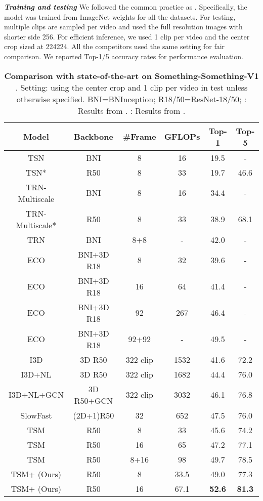 \documentclass[runningheads]{llncs}
\newcommand{\keypoint}[1]{\vspace{0.1cm}\noindent\textbf{#1}\quad}
\begin{document}
\keypoint{\em Training and testing }
We followed the common practice as \cite{lin2019tsm,wang2018non}.
Specifically, the model was trained from 
ImageNet weights
for all the datasets.
For testing, multiple clips are sampled per video and used the full resolution images with shorter side 256.  For efficient inference, we used 1 clip per video and the center crop sized at 224224.
All the competitors used the same setting for fair comparison.
We reported Top-1/5 accuracy rates for performance evaluation.



\begin{table}[h]
\centering
	\begin{tabular}{c|c|c|c|c|c}
		\toprule {\bf Model } & {\bf Backbone } & {\bf \#Frame } & {\bf GFLOPs} & {\bf Top-1 } & {\bf Top-5 } \\\midrule
		TSN \cite{wang2016temporal} & BNI & 8 & 16 & 19.5 & -\\TSN* \cite{wang2016temporal} & R50 & 8 & 33 & 19.7 & 46.6\\TRN-Multiscale \cite{zhou2018temporal} & BNI & 8 & 16 & 34.4 & -\\TRN-Multiscale* \cite{zhou2018temporal} & R50 & 8 & 33 & 38.9 & 68.1\\TRN \cite{zhou2018temporal} & BNI & 8+8 & - & 42.0 & -\\\midrule
		ECO \cite{zolfaghari2018eco} & BNI+3D R18 & 8 & 32 & 39.6 & -\\ECO \cite{zolfaghari2018eco} & BNI+3D R18 & 16 & 64 & 41.4 & -\\ECO \cite{zolfaghari2018eco} & BNI+3D R18 & 92 & 267 & 46.4 & -\\ECO \cite{zolfaghari2018eco} & BNI+3D R18 & 92+92 & - & 49.5 & -\\\midrule
		I3D \cite{carreira2017quo} & 3D R50 & 322 clip & 1532 & 41.6 & 72.2 \\I3D+NL \cite{wang2018non} & 3D R50 & 322 clip & 1682 & 44.4 & 76.0 \\I3D+NL+GCN \cite{wang2018videos} & 3D R50+GCN & 322 clip & 3032 & 46.1 & 76.8 \\SlowFast \cite{feichtenhofer2019slowfast} & (2D+1)R50 & 32 & 652 & 47.5 & 76.0 \\\midrule
		TSM \cite{lin2019tsm} & R50 & 8 & 33 & 45.6 & 74.2 \\TSM \cite{lin2019tsm} & R50 & 16 & 65 & 47.2 & 77.1 \\TSM \cite{lin2019tsm} & R50 & 8+16 & 98 & 49.7 & 78.5\\TSM+{\bf \shortname{}} (Ours)
		& R50 & 8 & 33.5 & 49.0 & 77.3 \\TSM+{\bf \shortname{}} (Ours)
		& R50 & 16 & 67.1 & \bf 52.6 & \bf 81.3\\\bottomrule
	\end{tabular}
	\vspace{.1cm}
	\caption{
	{\bf Comparison with state-of-the-art on Something-Something-V1 \cite{goyal2017something}}.
	Setting: using the center crop and 1 clip per video in test unless otherwise specified.
	BNI=BNInception;
	R18/50=ResNet-18/50;
	: Results from \cite{lin2019tsm}.
	: Results from \cite{wang2018videos}.
	}	
	\label{table:SSV1}
\end{table}
\end{document}
